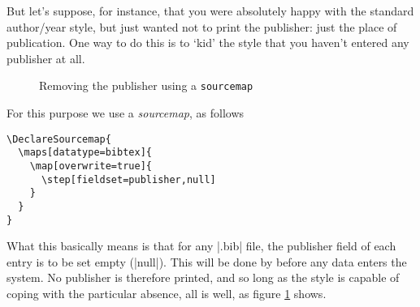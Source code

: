 But let's suppose, for instance, that you were absolutely happy with the standard author/year style, but just wanted not to print the publisher: just the place of publication. One way to do this is to `kid' the style that you haven't entered any publisher at all.
\begin{figure}
\vspace{0.5\baselineskip}

\caption{Removing the publisher using a \texttt{sourcemap}\label{punctcite12}}
\end{figure}

For this purpose we use a \emph{sourcemap}, as follows
\begin{Verbatim}
\DeclareSourcemap{
  \maps[datatype=bibtex]{
    \map[overwrite=true]{
      \step[fieldset=publisher,null]
    }
  }
}
\end{Verbatim}
What this basically means is that for any |.bib| file, the publisher field of each entry is to be set empty (|null|). This will be done by  before any data enters the system. No publisher is therefore printed, and so long as the style is capable of coping with the particular absence, all is well, as figure \ref{punctcite12} shows.